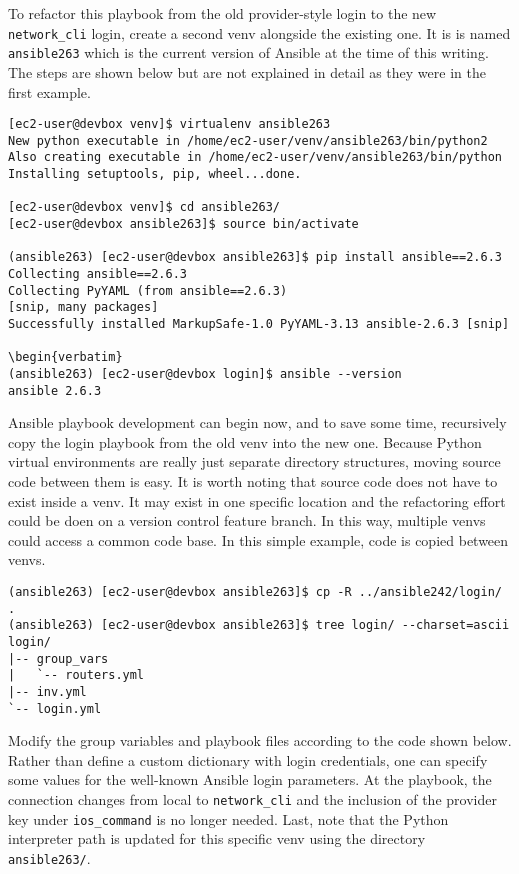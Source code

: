 To refactor this playbook from the old provider-style login to the new
\verb|network_cli| login, create a second venv alongside the existing one. It is
is named \verb|ansible263| which is the current version of Ansible at the time of
this writing. The steps are shown below but are not explained in detail as
they were in the first example.

\begin{verbatim}
[ec2-user@devbox venv]$ virtualenv ansible263
New python executable in /home/ec2-user/venv/ansible263/bin/python2
Also creating executable in /home/ec2-user/venv/ansible263/bin/python
Installing setuptools, pip, wheel...done.

[ec2-user@devbox venv]$ cd ansible263/
[ec2-user@devbox ansible263]$ source bin/activate

(ansible263) [ec2-user@devbox ansible263]$ pip install ansible==2.6.3
Collecting ansible==2.6.3
Collecting PyYAML (from ansible==2.6.3)
[snip, many packages]
Successfully installed MarkupSafe-1.0 PyYAML-3.13 ansible-2.6.3 [snip]

\begin{verbatim}
(ansible263) [ec2-user@devbox login]$ ansible --version
ansible 2.6.3
\end{verbatim}

Ansible playbook development can begin now, and to save some time, recursively
copy the login playbook from the old venv into the new one. Because Python
virtual environments are really just separate directory structures, moving
source code between them is easy. It is worth noting that source code does not
have to exist inside a venv. It may exist in one specific location and the
refactoring effort could be doen on a version control feature branch. In this
way, multiple venvs could access a common code base. In this simple example,
code is copied between venvs.

\begin{verbatim}
(ansible263) [ec2-user@devbox ansible263]$ cp -R ../ansible242/login/ .
(ansible263) [ec2-user@devbox ansible263]$ tree login/ --charset=ascii
login/
|-- group_vars
|   `-- routers.yml
|-- inv.yml
`-- login.yml
\end{verbatim}

Modify the group variables and playbook files according to the code shown
below. Rather than define a custom dictionary with login credentials, one can
specify some values for the well-known Ansible login parameters. At the
playbook, the connection changes from local to \verb|network_cli| and the inclusion
of the provider key under \verb|ios_command| is no longer needed. Last, note that the
Python interpreter path is updated for this specific venv using the directory
\verb|ansible263/|.

